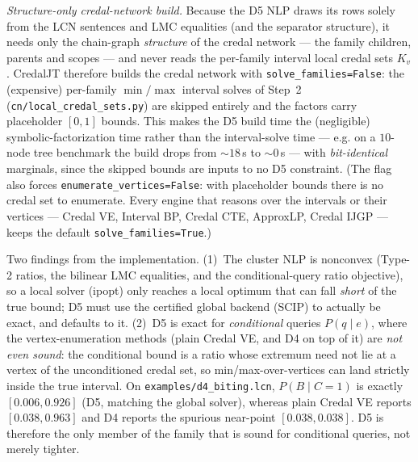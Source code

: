 \documentclass[11pt]{article}
\begin{document}
\smallskip\noindent\emph{Structure-only credal-network build.} Because the D5 NLP draws its
rows solely from the LCN sentences and LMC equalities (and the separator structure), it needs
only the chain-graph \emph{structure} of the credal network --- the family children, parents
and scopes --- and never reads the per-family interval local credal sets $K_v$. CredalJT
therefore builds the credal network with \texttt{solve\_families=False}: the (expensive)
per-family $\min/\max$ interval solves of Step~2 (\texttt{cn/local\_credal\_sets.py}) are
skipped entirely and the factors carry placeholder $[0,1]$ bounds. This makes the D5 build
time the (negligible) symbolic-factorization time rather than the interval-solve time --- e.g.
on a $10$-node tree benchmark the build drops from ${\sim}18$\,s to ${\sim}0$\,s --- with
\emph{bit-identical} marginals, since the skipped bounds are inputs to no D5 constraint. (The
flag also forces \texttt{enumerate\_vertices=False}: with placeholder bounds there is no credal
set to enumerate. Every engine that reasons over the intervals or their vertices --- Credal VE,
Interval BP, Credal CTE, ApproxLP, Credal IJGP --- keeps the default \texttt{solve\_families=True}.)

Two findings from the implementation. (1)~The cluster NLP is nonconvex (Type-2 ratios, the
bilinear LMC equalities, and the conditional-query ratio objective), so a local solver
(ipopt) only reaches a local optimum that can fall \emph{short} of the true bound; D5 must
use the certified global backend (SCIP) to actually be exact, and defaults to it. (2)~D5 is
exact for \emph{conditional} queries $P(q\mid e)$, where the vertex-enumeration methods
(plain Credal VE, and D4 on top of it) are \emph{not even sound}: the conditional bound is a
ratio whose extremum need not lie at a vertex of the unconditioned credal set, so
min/max-over-vertices can land strictly inside the true interval. On
\texttt{examples/d4\_biting.lcn}, $P(B\mid C{=}1)$ is exactly $[0.006,0.926]$ (D5, matching
the global solver), whereas plain Credal VE reports $[0.038,0.963]$ and D4 reports the
spurious near-point $[0.038,0.038]$. D5 is therefore the only member of the family that is
sound for conditional queries, not merely tighter.
\end{document}
